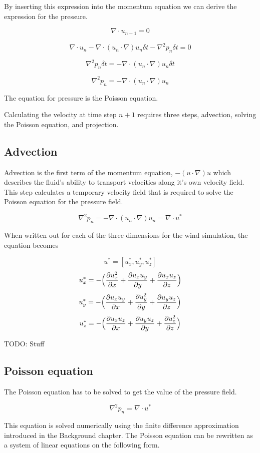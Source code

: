By inserting this expression into the momentum equation we can derive the
expression for the pressure. 

$$ \nabla \cdot u_{n+1} = 0 $$

$$ \nabla \cdot u_n - \nabla \cdot (u_n \cdot \nabla)u_n \delta t - \nabla^2 p_n \delta t = 0 $$

$$ \nabla^2 p_n \delta t = - \nabla \cdot (u_n \cdot \nabla)u_n \delta t $$

$$ \nabla^2 p_n = - \nabla \cdot (u_n \cdot \nabla)u_n $$

The equation for pressure is the Poisson equation. 

Calculating the velocity at time step $n+1$ requires three steps, advection, 
solving the Poisson equation, and projection.

\subsection{Advection}

Advection is the first term of the momentum equation, $-(u \cdot \nabla)u$ which
describes the fluid's ability to transport velocities along it's own velocity 
field. This step calculates a temporary velocity field that is required to solve
the Poisson equation for the pressure field.

$$ \nabla^2 p_n = - \nabla \cdot (u_n \cdot \nabla)u_n = \nabla \cdot u^* $$

When written out for each of the three dimensions for the wind simulation, the
equation becomes

$$ u^* = [u^*_x, u^*_y, u^*_z] $$
$$ u^*_x = - \Big( \frac{\partial u_x^2}{\partial x} + \frac{\partial u_x u_y}{\partial y} + \frac{\partial u_x u_z}{\partial z}\Big) $$
$$ u^*_y = - \Big( \frac{\partial u_x u_y}{\partial x} + \frac{\partial u_y^2}{\partial y} + \frac{\partial u_y u_z}{\partial z}\Big) $$
$$ u^*_z = - \Big( \frac{\partial u_x u_z}{\partial x} + \frac{\partial u_y u_z}{\partial y} + \frac{\partial u_z^2}{\partial z}\Big) $$

TODO: Stuff

\subsection{Poisson equation}

The Poisson equation has to be solved to get the value of the pressure field. 

$$ \nabla^2 p_n = \nabla \cdot u^* $$

This equation is solved numerically using the finite difference approximation
introduced in the Background chapter. The Poisson equation can be rewritten as 
a system of linear equations on the following form.

